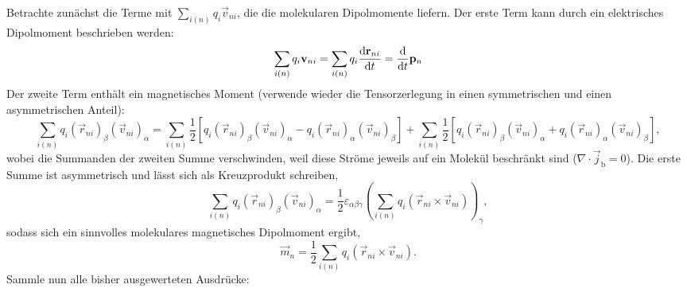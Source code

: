 Betrachte zunächst die Terme mit $\sum _{i\left(n\right)}q_{i}\vec {v}_{ni}$, die die molekularen Dipolmomente liefern. Der erste Term kann durch ein elektrisches Dipolmoment beschrieben werden:
\begin{equation*}
	\sum _{i\left(n\right)}q_{i}\mathbf{v}_{ni}=\sum _{i\left(n\right)}q_{i}\frac{\text{d} \mathbf{r}_{ni}}{\text{d} t}=\frac{\text{d} }{\text{d} t}\mathbf{p}_{n}
\end{equation*}
Der zweite Term enthält ein magnetisches Moment (verwende wieder die Tensorzerlegung in einen symmetrischen und einen asymmetrischen Anteil):
\begin{equation*}
	\sum _{i\left(n\right)}q_{i}\left(\vec {r}_{ni}\right)_{\beta }\left(\vec {v}_{ni}\right)_{\alpha }=\sum _{i\left(n\right)}\frac{1}{2}\left[q_{i}\left(\vec {r}_{ni}\right)_{\beta }\left(\vec {v}_{ni}\right)_{\alpha }-q_{i}\left(\vec {r}_{ni}\right)_{\alpha }\left(\vec {v}_{ni}\right)_{\beta }\right]+\sum _{i\left(n\right)}\frac{1}{2}\left[q_{i}\left(\vec {r}_{ni}\right)_{\beta }\left(\vec {v}_{ni}\right)_{\alpha }+q_{i}\left(\vec {r}_{ni}\right)_{\alpha }\left(\vec {v}_{ni}\right)_{\beta }\right],
\end{equation*}
wobei die Summanden der zweiten Summe verschwinden, weil diese Ströme jeweils auf ein Molekül beschränkt sind ($\nabla\cdot \vec {j}_{\mathrm{b}}=0$). Die erste Summe ist asymmetrisch und lässt sich als Kreuzprodukt schreiben,
\begin{equation*}
	\sum _{i\left(n\right)}q_{i}\left(\vec {r}_{ni}\right)_{\beta }\left(\vec {v}_{ni}\right)_{\alpha }=\frac{1}{2}\varepsilon _{\alpha \beta \gamma }\left(\sum _{i\left(n\right)}q_{i}\left(\vec {r}_{ni}\times \vec {v}_{ni}\right)\right)_{\gamma },
\end{equation*}
sodass sich ein sinnvolles molekulares magnetisches Dipolmoment ergibt,
\begin{equation*}
	\vec {m}_{n}=\frac{1}{2}\sum _{i\left(n\right)}q_{i}\left(\vec {r}_{ni}\times \vec {v}_{ni}\right).
\end{equation*}
Sammle nun alle bisher ausgewerteten Ausdrücke:
